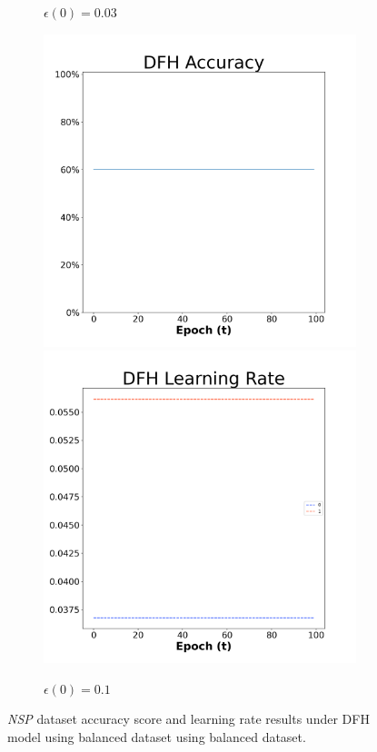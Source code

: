 \begin{figure}[H]
\begin{subfigure}{0.3\textwidth}
  \caption{$\epsilon(0)=0.03$}
\end{subfigure}\hfil %
\begin{subfigure}{0.3\textwidth}
  \includegraphics[width=\linewidth]{images/exper1/NSP/DFH_0.1_acc.png}
  \includegraphics[width=\linewidth]{images/exper1/NSP/DFH_0.1_lr.png}
  \caption{$\epsilon(0)=0.1$}
\end{subfigure}

\caption{\textit{NSP} dataset accuracy score and learning rate results under DFH model using balanced dataset using balanced dataset.}
\end{figure}

